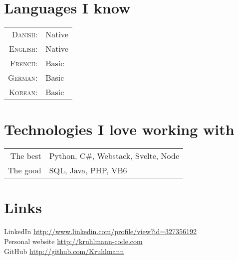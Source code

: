 \documentclass[a4paper,10pt]{article}
\begin{document}
\section{Languages I know}
\begin{tabular}{rl}
 \textsc{Danish:}&Native\\
\textsc{English:}&Native\\
\textsc{French:}&Basic\\
\textsc{German:}&Basic\\
\textsc{Korean:}&Basic\\
\end{tabular}

\section{Technologies I love working with}
\begin{tabular}{rl}
 The best & Python, C\#, Webstack, Svelte, Node\\
 The good & SQL, Java, PHP, VB6
\end{tabular}

\section{Links}
LinkedIn \href{ http://www.linkedin.com/profile/view?id=327356192}{http://www.linkedin.com/profile/view?id=327356192}\\
Personal website \href{http://kruhlmann-code.com}{http://kruhlmann-code.com}\\
GitHub  \href{http://github.com/Kruhlmann}{http://github.com/Kruhlmann}
\end{document}
